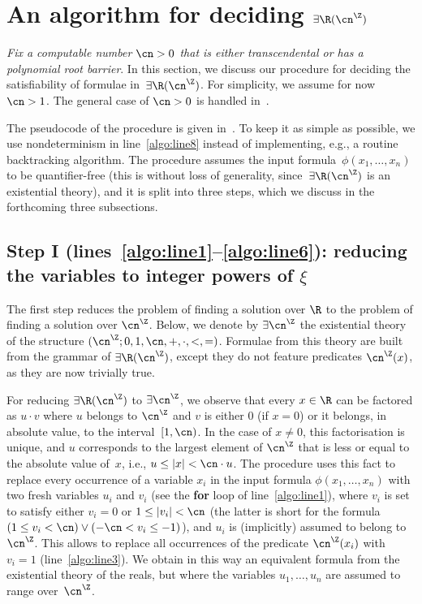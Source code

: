 \section{An algorithm for deciding \texorpdfstring{$\exists\R(\ipow{\cn})$}{the existential theory}}
\label{sec:the-algorithm}

\emph{Fix a computable number $\cn > 0$ that is either transcendental or has a
polynomial root barrier}. In this section, we discuss our procedure for deciding
the satisfiability of formulae in~$\exists\R(\ipow{\cn})$. For simplicity, we
assume for now $\cn > 1$. The general case of $\cn > 0$ is handled
in~.

The pseudocode of the procedure is given in~. To keep
it as simple as possible, we use nondeterminism in line~\ref{algo:line8} instead
of implementing, e.g., a routine backtracking algorithm. The procedure assumes
the input formula~$\phi(x_1,\dots,x_n)$ to be quantifier-free (this is without
loss of generality, since~$\exists\R(\ipow{\cn})$ is an existential theory), 
and it is split into three steps, which we discuss in the forthcoming three
subsections.




\subsection{Step I (lines~\ref{algo:line1}--\ref{algo:line6}): reducing the
variables to integer powers of
\texorpdfstring{$\xi$}{the base}}\label{subsection:reduction-to-substructure}

The first step reduces the problem of finding a solution over $\R$ to the
problem of finding a solution over $\ipow{\cn}$. Below, we denote by
$\exists\ipow{\cn}$ the existential theory of the structure $(\ipow{\cn}; 0, 1,
\cn, +, \cdot, <,=)$. Formulae from this theory are built from the grammar of
$\exists\R(\ipow{\cn})$, except they do not feature predicates $\ipow{\cn}(x)$,
as they are now trivially true.

For reducing $\exists\R(\ipow{\cn})$ to $\exists\ipow{\cn}$, we observe that
every $x \in \R$ can be factored as $u \cdot v$ where $u$ belongs to
$\ipow{\cn}$ and $v$ is either $0$ (if $x = 0$) or it belongs, in absolute
value, to the interval~$[1,\cn)$. In the case of $x \neq 0$, this factorisation
is unique, and $u$ corresponds to the largest element of $\ipow{\cn}$ that is
less or equal to the absolute value of~$x$, i.e., $u \leq \abs{x} < \cn \cdot
u$. The procedure uses this fact to replace every occurrence of a variable $x_i$
in the input formula $\phi(x_1,\dots,x_n)$ with two fresh variables $u_i$ and
$v_i$ (see the \textbf{for} loop of line~\ref{algo:line1}), where $v_i$ is set
to satisfy either $v_i = 0$ or $1 \leq \abs{v_i} < \cn$ (the latter is short for
the formula $(1 \leq v_i < \cn) \lor (-\cn < v_i \leq -1)$), and $u_i$ is
(implicitly) assumed to belong to $\ipow{\cn}$. This allows to replace all
occurrences of the predicate $\ipow{\cn}(x_i)$ with $v_i = 1$
(line~\ref{algo:line3}). We obtain in this way an equivalent formula from the
existential theory of the reals, but where the variables $u_1,\dots,u_n$ are
assumed to range over~$\ipow{\cn}$.

